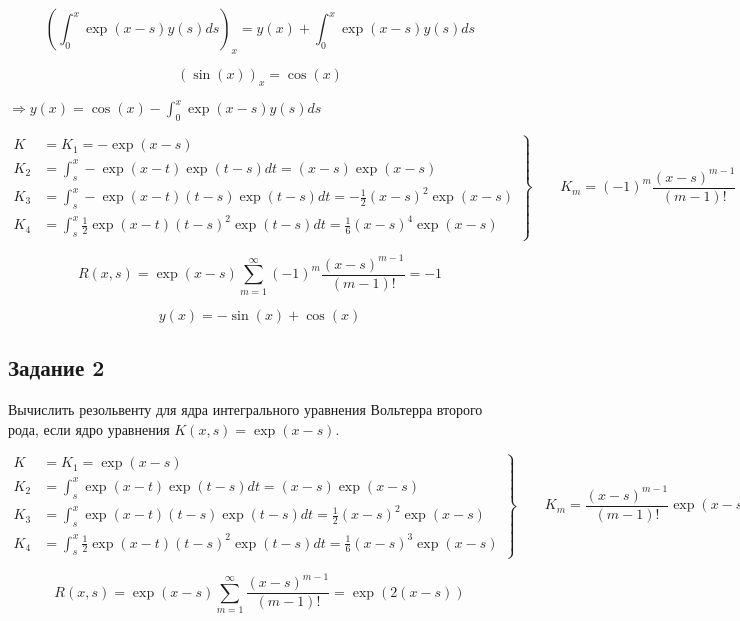 \documentclass[
11pt,
master, %
subf, %
href, %
colorlinks=true, %
times, %
]{disser}
\begin{document}
$$\left(\int_{0}^{x} \exp(x-s) y(s) ds\right)_{x} = y(x) + \int_{0}^{x} \exp(x-s) y(s) ds$$

$$\left( \sin(x) \right)_{x} = \cos(x)$$

$\displaystyle \Rightarrow y(x) = \cos(x) - \int_{0}^{x} \exp(x-s) y(s) ds$

\begin{equation*}
 \left.\begin{aligned}
        K &= K_1 = -\exp(x-s)\\
        K_2 &= \int_{s}^{x} -\exp(x-t)\exp(t-s) dt  = (x-s)\exp(x-s)\\
        K_3 &= \int_{s}^{x} -\exp(x-t)(t-s)\exp(t-s) dt = -\frac{1}{2}(x-s)^2 \exp(x-s)\\
        K_4 &= \int_{s}^{x} \frac{1}{2}\exp(x-t)(t-s)^2 \exp(t-s) dt = \frac{1}{6}(x-s)^4 \exp(x-s)
       \end{aligned}
 \right\}
 \qquad K_m = (-1)^{m}\frac{(x-s)^{m-1}}{(m-1)!}\exp(x-s)
\end{equation*}



$$R(x,s) = \exp(x-s)\sum_{m=1}^{\infty} (-1)^{m}\frac{(x-s)^{m-1}}{(m-1)!} = -1$$

$$y(x) = -\sin(x) + \cos(x)$$

\subsection{Задание 2}
Вычислить резольвенту для ядра интегрального уравнения Вольтерра второго рода, если ядро уравнения $K(x,s) = \exp(x-s)$.

\begin{equation*}
 \left.\begin{aligned}
        K &= K_1 = \exp(x-s)\\
        K_2 &= \int_{s}^{x} \exp(x-t)\exp(t-s) dt  = (x-s)\exp(x-s)\\
        K_3 &= \int_{s}^{x} \exp(x-t)(t-s)\exp(t-s) dt = \frac{1}{2}(x-s)^2 \exp(x-s)\\
        K_4 &= \int_{s}^{x} \frac{1}{2}\exp(x-t)(t-s)^2 \exp(t-s) dt = \frac{1}{6}(x-s)^3 \exp(x-s)
       \end{aligned}
 \right\}
 \qquad K_m = \frac{(x-s)^{m-1}}{(m-1)!}\exp(x-s)
\end{equation*}

$$R(x,s) = \exp(x-s)\sum_{m=1}^{\infty} \frac{(x-s)^{m-1}}{(m-1)!} = \exp(2(x-s))$$
\end{document}
